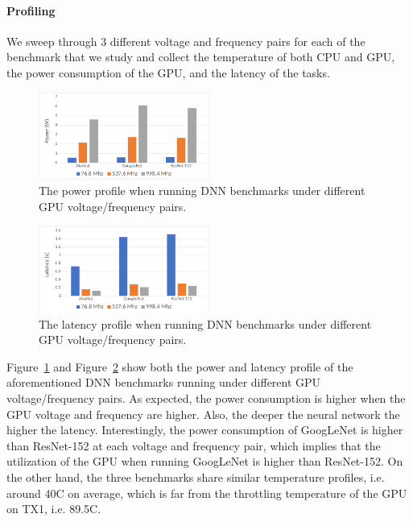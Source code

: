 \paragraph{Profiling}

We sweep through 3 different voltage and frequency pairs for each of the benchmark that we study and collect the temperature of both CPU and GPU, the power consumption of the GPU, and the latency of the tasks.

\begin{figure}[h]
    \centering
    \includegraphics[width=0.5\textwidth]{power_profile.png}
    \caption{The power profile when running DNN benchmarks under different GPU voltage/frequency pairs.}\label{fig:1}
\end{figure}

\begin{figure}[h]
    \centering
    \includegraphics[width=0.5\textwidth]{latency_profile.png}
    \caption{The latency profile when running DNN benchmarks under different GPU voltage/frequency pairs.}\label{fig:2}
\end{figure}

Figure~\ref{fig:1} and Figure~\ref{fig:2} show both the power and latency profile of the aforementioned DNN benchmarks running under different GPU voltage/frequency pairs. As expected, the power consumption is higher when the GPU voltage and frequency are higher. Also, the deeper the neural network the higher the latency. Interestingly, the power consumption of GoogLeNet is higher than ResNet-152 at each voltage and frequency pair, which implies that the utilization of the GPU when running GoogLeNet is higher than ResNet-152. On the other hand, the three benchmarks share similar temperature profiles, i.e. around 40C on average, which is far from the throttling temperature of the GPU on TX1, i.e. 89.5C.

